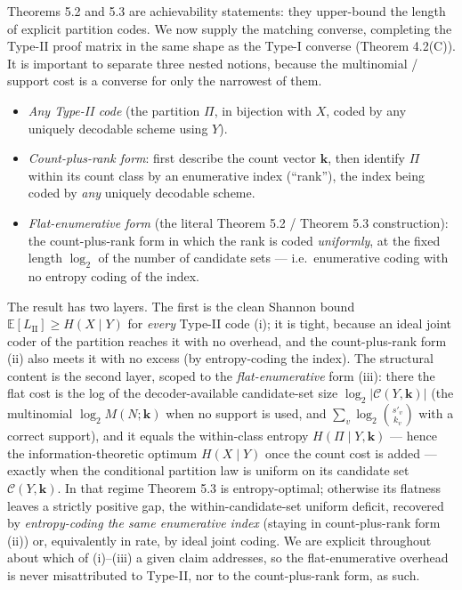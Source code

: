 \documentclass[
]{article}
\begin{document}
Theorems 5.2 and 5.3 are achievability statements: they upper-bound the
length of explicit partition codes. We now supply the matching
converse, completing the Type-II proof matrix in the same shape as the
Type-I converse (Theorem 4.2(C)). It is important to separate three
nested notions, because the multinomial / support cost is a converse for
only the narrowest of them.
\begin{itemize}
\item[(i)] \emph{Any Type-II code} (the partition $\Pi$, in bijection
with $X$, coded by any uniquely decodable scheme using $Y$).
\item[(ii)] \emph{Count-plus-rank form}: first describe the count vector
$\mathbf{k}$, then identify $\Pi$ within its count class by an
enumerative index (``rank''), the index being coded by \emph{any}
uniquely decodable scheme.
\item[(iii)] \emph{Flat-enumerative form} (the literal Theorem 5.2 /
Theorem 5.3 construction): the count-plus-rank form in which the rank is
coded \emph{uniformly}, at the fixed length $\log_2$ of the number of
candidate sets --- i.e.\ enumerative coding with no entropy coding of the
index.
\end{itemize}
The result has two layers. The first is the clean Shannon bound
$\mathbb{E}[L_{\mathrm{II}}] \geq H(X \mid Y)$ for \emph{every} Type-II
code (i); it is tight, because an ideal joint coder of the partition
reaches it with no overhead, and the count-plus-rank form (ii) also
meets it with no excess (by entropy-coding the index). The structural
content is the second layer, scoped to the \emph{flat-enumerative} form
(iii): there the flat cost is the log of the decoder-available
candidate-set size $\log_2 |\mathcal{C}(Y,\mathbf{k})|$ (the multinomial
$\log_2 M(N;\mathbf{k})$ when no support is used, and
$\sum_v \log_2 \binom{s'_v}{k_v}$ with a correct support), and it equals
the within-class entropy $H(\Pi \mid Y, \mathbf{k})$ --- hence the
information-theoretic optimum $H(X \mid Y)$ once the count cost is added
--- exactly when the conditional partition law is uniform on its
candidate set $\mathcal{C}(Y,\mathbf{k})$. In that regime Theorem 5.3 is
entropy-optimal; otherwise its flatness leaves a strictly positive gap,
the within-candidate-set uniform deficit, recovered by
\emph{entropy-coding the same enumerative index} (staying in
count-plus-rank form (ii)) or, equivalently in rate, by ideal joint
coding. We are explicit throughout about which of (i)--(iii) a given
claim addresses, so the flat-enumerative overhead is never misattributed
to Type-II, nor to the count-plus-rank form, as such.
\end{document}
